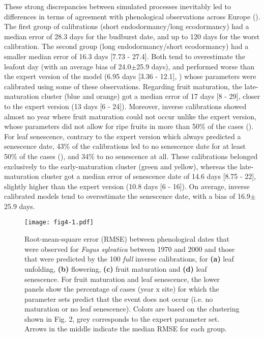 \documentclass[preprint,12pt,authoryear]{elsarticle}
\begin{document}
These strong discrepancies between simulated processes inevitably led to differences in terms of agreement with phenological observations across Europe (). The first group of calibrations (short endodormancy/long ecodormancy) had a median error of 28.3 days for the budburst date, and up to 120 days for the worst calibration. The second group (long endodormancy/short ecodormancy) had a smaller median error of 16.3 days [7.73 - 27.4]. \textcolor{customred}{Both tend to overestimate the leafout day (with an average bias of 24.0$\pm$25.9 days), and} performed worse than the expert version of the model (6.95 days [3.36 - 12.1], ) whose parameters were calibrated using some of these observations. Regarding fruit maturation, the late-maturation cluster (blue and orange) got a median error of 17 days [8 - 29], closer to the expert version (13 days [6 - 24]). Moreover, inverse calibrations showed almost no year where fruit maturation could not occur unlike the expert version, whose parameters did not allow for ripe fruits in more than 50\% of the cases (). For leaf senescence, contrary to the expert version which always predicted a senescence date, 43\% of the calibrations led to no senescence date for at least 50\% of the cases (), and 34\% to no senescence at all. These calibrations belonged exclusively to the early-maturation cluster (green and yellow), whereas the late-maturation cluster got a median error of senescence date of 14.6 days [8.75 - 22], slightly higher than the expert version (10.8 days [6 - 16]). \textcolor{customred}{On average, inverse calibrated models tend to overestimate the senescence date, with a bias of 16.9$\pm$25.9 days.}

\begin{figure}
\centering
\begin{subcaptiongroup}
\label{fig:3A} 
\label{fig:3B}
\label{fig:3C}
\label{fig:3D}
\label{fig:3E}
\end{subcaptiongroup}
\centerline{\texttt{[image: fig4-1.pdf]}}
\caption{Root-mean-square error (RMSE) between phenological dates that were observed for \emph{Fagus sylvatica} between 1970 and 2000 and those that were predicted by the 100 \emph{full} inverse calibrations, for \textbf{(a)} leaf unfolding, \textbf{(b)} flowering, \textbf{(c)} fruit maturation and \textbf{(d)} leaf senescence. For fruit maturation and leaf senescence, the lower panels show the percentage of cases (year x site) for which the parameter sets predict that the event does not occur (i.e. no maturation or no leaf senescence). Colors are based on the clustering shown in Fig. 2, grey corresponds to the expert parameter set. Arrows in the middle indicate the median RMSE for each group.}
\label{fig:3}
\end{figure}
\end{document}
